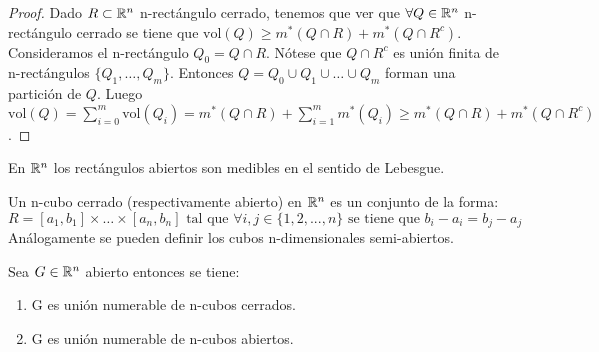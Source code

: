 \begin{proof}
    Dado $R \subset \mathbb{R}^n$ n-rectángulo cerrado, tenemos que ver que $\forall Q \in \mathbb{R}^n$ n-rectángulo cerrado se tiene que $\text{vol}(Q) \geq m^*(Q \cap R) + m^*(Q \cap R^c)$. Consideramos el n-rectángulo $Q_0 = Q \cap R$. Nótese que $Q \cap R^c$ es unión finita de n-rectángulos $\{Q_1,\ldots, Q_m\}$. Entonces $Q = Q_0 \cup Q_1 \cup \ldots \cup Q_m$ forman una partición de $Q$. Luego $\text{vol}(Q) = \sum_{i=0}^m \text{vol}(Q_i) = m^*(Q \cap R) + \sum_{i=1}^m m^*(Q_i) \geq m^*(Q \cap R) + m^*(Q \cap R^c)$.
\end{proof}

\begin{observación}
En $\mathbb{R}^n$ los rectángulos abiertos son medibles en el sentido de Lebesgue.
\end{observación}

\label{n-Cubo}
\begin{definición}[n-Cubo]
Un n-cubo cerrado (respectivamente abierto) en $\mathbb{R}^n$ es un conjunto de la forma:
\begin{equation}
    R = [a_1, b_1] \times \ldots \times [a_n, b_n] \text{ tal que } \forall i,j \in \{1,2,...,n\} \text{ se tiene que } b_i - a_i = b_j - a_j
\end{equation}
Análogamente se pueden definir los cubos n-dimensionales semi-abiertos.
\end{definición}


\begin{teorema}
    Sea $G \in \mathbb{R}^n$ abierto entonces se tiene:
    \begin{enumerate}
        \item G es unión numerable de n-cubos cerrados.
        \item G es unión numerable de n-cubos abiertos.
    \end{enumerate}
\end{teorema}

